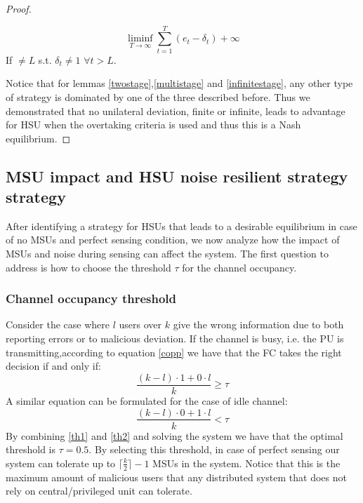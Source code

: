 \documentclass[letterpaper, 10 pt, conference]{ieeeconf}  %
\begin{document}
\begin{proof}
\begin{itemize}
{\begin{equation}
\liminf_{T \to \infty}\sum\limits_{t=1}^T(e_t-\delta_t)+\infty
\end{equation}
If $\neq L$ s.t. $\delta_t\neq 1$ $\forall t>L$.
}
\end{itemize}
Notice that for lemmas \ref{twostage},\ref{multistage} and \ref{infinitestage}, any other type of strategy is dominated by one of the three described before.
Thus we demonstrated that no unilateral deviation, finite or infinite, leads to advantage for HSU when the overtaking criteria is used and thus this is a Nash equilibrium\cite{tadel}.
\end{proof} 

\subsection{MSU impact and HSU noise resilient strategy strategy}
After identifying a strategy for HSUs that leads to a desirable equilibrium in case of no MSUs and perfect sensing condition, we now analyze how the impact of MSUs and noise during sensing can affect the system. The first question to address is how to choose the threshold $\tau$ for the channel occupancy.  
\subsubsection{Channel occupancy threshold}
Consider the case where $l$ users over $k$ give the wrong information due to both reporting errors or to malicious deviation. If the channel is busy, i.e. the PU is transmitting,according to equation \ref{copp} we have that the FC takes the right decision if and only if:
\begin{equation}
\frac{(k-l)\cdot 1+0\cdot l}{k}\geq{\tau}
\label{th1}
\end{equation}
A similar equation can be formulated for the case of idle channel:
\begin{equation}
\frac{(k-l)\cdot 0 +1\cdot l}{k}<\tau
\label{th2}
\end{equation}
By combining \ref{th1} and \ref{th2} and solving the system we have that the optimal threshold is $\tau=0.5$. By selecting this threshold, in case of perfect sensing our system can tolerate up to $\lceil\frac{k}{2}\rceil -1$ MSUs in the system. Notice that this is the maximum amount of malicious users that any distributed system that does not rely on central/privileged unit can tolerate.
\end{document}
